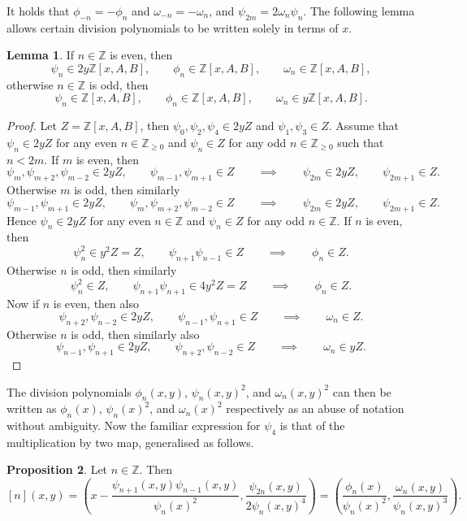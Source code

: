 \documentclass{article}
\newcommand{\Z}{\mathbb{Z}}
\newcommand{\rb}[1]{\left( #1 \right)}
\renewcommand{\sb}[1]{\left[ #1 \right]}
\theoremstyle{definition}
\newtheorem{proposition}{Proposition}[subsection]
\newtheorem{lemma}[proposition]{Lemma}
\begin{document}
It holds that $ \phi_{-n} = -\phi_n $ and $ \omega_{-n} = -\omega_n $, and $ \psi_{2m} = 2\omega_n\psi_n $. The following lemma allows certain division polynomials to be written solely in terms of $ x $.

\begin{lemma}
If $ n \in \Z $ is even, then
$$ \psi_n \in 2y\Z\sb{x, A, B}, \qquad \phi_n \in \Z\sb{x, A, B}, \qquad \omega_n \in \Z\sb{x, A, B}, $$
otherwise $ n \in \Z $ is odd, then
$$ \psi_n \in \Z\sb{x, A, B}, \qquad \phi_n \in \Z\sb{x, A, B}, \qquad \omega_n \in y\Z\sb{x, A, B}. $$
\end{lemma}

\begin{proof}
Let $ Z = \Z\sb{x, A, B} $, then $ \psi_0, \psi_2, \psi_4 \in 2yZ $ and $ \psi_1, \psi_3 \in Z $. Assume that $ \psi_n \in 2yZ $ for any even $ n \in \Z_{\ge 0} $ and $ \psi_n \in Z $ for any odd $ n \in \Z_{\ge 0} $ such that $ n < 2m $. If $ m $ is even, then
$$ \psi_m, \psi_{m + 2}, \psi_{m - 2} \in 2yZ, \qquad \psi_{m - 1}, \psi_{m + 1} \in Z \qquad \implies \qquad \psi_{2m} \in 2yZ, \qquad \psi_{2m + 1} \in Z. $$
Otherwise $ m $ is odd, then similarly
$$ \psi_{m - 1}, \psi_{m + 1} \in 2yZ, \qquad \psi_m, \psi_{m + 2}, \psi_{m - 2} \in Z \qquad \implies \qquad \psi_{2m} \in 2yZ, \qquad \psi_{2m + 1} \in Z. $$
Hence $ \psi_n \in 2yZ $ for any even $ n \in \Z $ and $ \psi_n \in Z $ for any odd $ n \in \Z $. If $ n $ is even, then
$$ \psi_n^2 \in y^2Z = Z, \qquad \psi_{n + 1}\psi_{n - 1} \in Z \qquad \implies \qquad \phi_n \in Z. $$
Otherwise $ n $ is odd, then similarly
$$ \psi_n^2 \in Z, \qquad \psi_{n + 1}\psi_{n + 1} \in 4y^2Z = Z \qquad \implies \qquad \phi_n \in Z. $$
Now if $ n $ is even, then also
$$ \psi_{n + 2}, \psi_{n - 2} \in 2yZ, \qquad \psi_{n - 1}, \psi_{n + 1} \in Z \qquad \implies \qquad \omega_n \in Z. $$
Otherwise $ n $ is odd, then similarly also
$$ \psi_{n - 1}, \psi_{n + 1} \in 2yZ, \qquad \psi_{n + 2}, \psi_{n - 2} \in Z \qquad \implies \qquad \omega_n \in yZ. $$
\end{proof}

The division polynomials $ \phi_n\rb{x, y} $, $ \psi_n\rb{x, y}^2 $, and $ \omega_n\rb{x, y}^2 $ can then be written as $ \phi_n\rb{x} $, $ \psi_n\rb{x}^2 $, and $ \omega_n\rb{x}^2 $ respectively as an abuse of notation without ambiguity. Now the familiar expression for $ \psi_4 $ is that of the multiplication by two map, generalised as follows.

\begin{proposition}
Let $ n \in \Z $. Then
$$ \sb{n}\rb{x, y} = \rb{x - \dfrac{\psi_{n + 1}\rb{x, y}\psi_{n - 1}\rb{x, y}}{\psi_n\rb{x}^2}, \dfrac{\psi_{2n}\rb{x, y}}{2\psi_n\rb{x, y}^4}} = \rb{\dfrac{\phi_n\rb{x}}{\psi_n\rb{x}^2}, \dfrac{\omega_n\rb{x, y}}{\psi_n\rb{x, y}^3}}. $$
\end{proposition}
\end{document}
